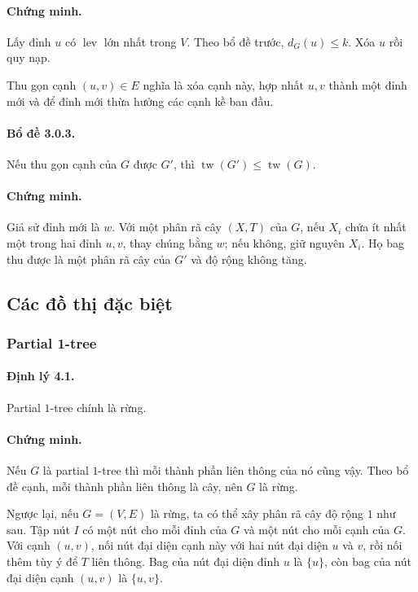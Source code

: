 \documentclass[11pt]{article}
\begin{document}
\paragraph{Chứng minh.}
Lấy đỉnh $u$ có $\operatorname{lev}$ lớn nhất trong $V$. Theo bổ đề trước,
$d_G(u)\le k$. Xóa $u$ rồi quy nạp.

Thu gọn cạnh $(u,v)\in E$ nghĩa là xóa cạnh này, hợp nhất $u,v$ thành một đỉnh
mới và để đỉnh mới thừa hưởng các cạnh kề ban đầu.

\paragraph{Bổ đề 3.0.3.}
Nếu thu gọn cạnh của $G$ được $G'$, thì
$\operatorname{tw}(G')\le\operatorname{tw}(G)$.

\paragraph{Chứng minh.}
Giả sử đỉnh mới là $w$. Với một phân rã cây $(X,T)$ của $G$, nếu
$X_i$ chứa ít nhất một trong hai đỉnh $u,v$, thay chúng bằng $w$; nếu không,
giữ nguyên $X_i$. Họ bag thu được là một phân rã cây của $G'$ và độ rộng không
tăng.

\subsection{Các đồ thị đặc biệt}

\subsubsection{Partial 1-tree}

\paragraph{Định lý 4.1.}
Partial $1$-tree chính là rừng.

\paragraph{Chứng minh.}
Nếu $G$ là partial $1$-tree thì mỗi thành phần liên thông của nó cũng vậy. Theo
bổ đề cạnh, mỗi thành phần liên thông là cây, nên $G$ là rừng.

Ngược lại, nếu $G=(V,E)$ là rừng, ta có thể xây phân rã cây độ rộng $1$ như
sau. Tập nút $I$ có một nút cho mỗi đỉnh của $G$ và một nút cho mỗi cạnh của
$G$. Với cạnh $(u,v)$, nối nút đại diện cạnh này với hai nút đại diện $u$ và
$v$, rồi nối thêm tùy ý để $T$ liên thông. Bag của nút đại diện đỉnh $u$ là
$\{u\}$, còn bag của nút đại diện cạnh $(u,v)$ là $\{u,v\}$.
\end{document}
